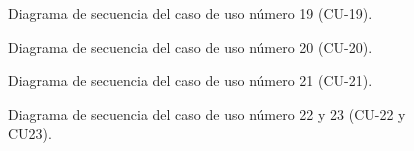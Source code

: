 \begin{figure}[htbp!]
	\begin{center}
		\caption{Diagrama de secuencia del caso de uso número 19 (CU-19).}
		\label{fig:Diagrama de secuencia CU-19}
	\end{center}
\end{figure}

\begin{figure}[htbp!]
	\begin{center}
		\caption{Diagrama de secuencia del caso de uso número 20 (CU-20).}
		\label{fig:Diagrama de secuencia CU-20}
	\end{center}
\end{figure}

\begin{figure}[htbp!]
	\begin{center}
		\caption{Diagrama de secuencia del caso de uso número 21 (CU-21).}
		\label{fig:Diagrama de secuencia CU-21}
	\end{center}
\end{figure}

\begin{figure}[htbp!]
	\begin{center}
		\caption{Diagrama de secuencia del caso de uso número 22 y 23 (CU-22 y CU23).}
		\label{fig:Diagrama de secuencia CU-22 y CU23}
	\end{center}
\end{figure}


